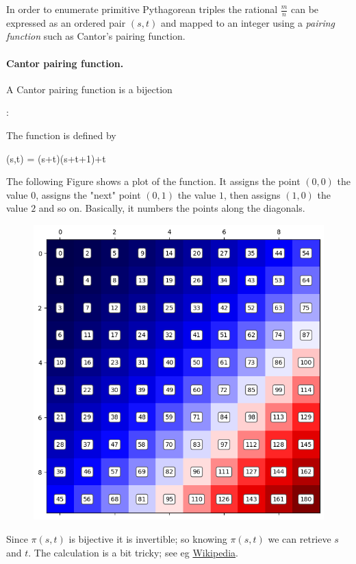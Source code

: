 In order to enumerate primitive Pythagorean triples the rational $\frac{m}{n}$ can be expressed as an ordered pair $(s,t)$ and mapped to an integer using a \emph{pairing function} such as Cantor's pairing function.

\paragraph{Cantor pairing function.} A Cantor pairing function is a bijection

\bee
\pi: \Nc \times \Nc \rightarrow \Nc
\eee

The function is defined by

\bee
\pi(s,t) = (s+t)(s+t+1)+t
\eee

The following Figure shows a plot of the function. It assigns the point $(0,0)$ the value $0$, assigns the "next" point $(0,1)$ the value $1$, then assigns $(1,0)$ the value $2$ and so on. Basically, it numbers the points along the diagonals.

\begin{figure}[H]
    \centering
    \includegraphics[scale=0.5]{images/2023_04_12_cantor.png}
\end{figure}

Since $\pi(s,t)$ is bijective it is invertible; so knowing $\pi(s,t)$ we can retrieve $s$ and $t$. The calculation is a bit tricky; see eg \href{https://en.m.wikipedia.org/wiki/Pairing_function}{Wikipedia}.


